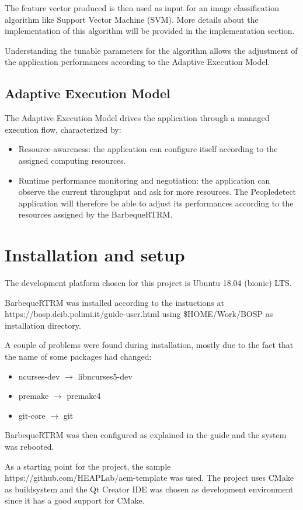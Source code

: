 The feature vector produced is then used as input for an image
classification algorithm like Support Vector Machine (SVM).
More details about the implementation of this algorithm will be
provided in the implementation section.

Understanding the tunable parameters for the algorithm allows the
adjustment of the application performances according to the Adaptive
Execution Model.

\subsection{Adaptive Execution Model}
The Adaptive Execution Model drives the application through a
managed execution flow, characterized by:
\begin{itemize}
\item Resource-awareness: the application can configure itself
	according to the assigned computing resources.
\item Runtime performance monitoring and negotiation: the
	application can observe the current throughput and ask for
	more resources.
	The Peopledetect application will therefore be able to adjust its
	performances according to the resources assigned by
	the BarbequeRTRM.
\end{itemize}

\section{Installation and setup}
The development platform chosen for this project is 
Ubuntu 18.04 (bionic) LTS.

BarbequeRTRM was installed according to the instuctions at
https://bosp.deib.polimi.it/guide-user.html
using \$HOME/Work/BOSP as installation directory.

A couple of problems were found during installation,
mostly due to the fact that the name of some packages had changed:
\begin{itemize}
\item ncurses-dev $\rightarrow$ libncurses5-dev
\item premake $\rightarrow$ premake4
\item git-core $\rightarrow$ git
\end{itemize}

BarbequeRTRM was then configured as explained in the guide
and the system was rebooted.

As a starting point for the project, the sample
https://github.com/HEAPLab/aem-template
was used.
The project uses CMake as buildsystem and the Qt Creator IDE
was chosen as development environment since it has a good
support for CMake.

